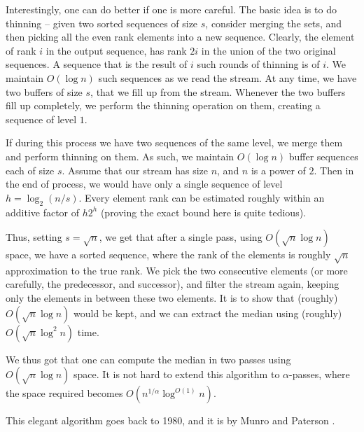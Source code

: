 \begin{remark}
    Interestingly, one can do better if one is more careful. The basic
    idea is to do thinning -- given two sorted sequences of size $s$,
    consider merging the sets, and then picking all the even rank
    elements into a new sequence. Clearly, the element of rank $i$ in
    the output sequence, has rank $2i$ in the union of the two
    original sequences. A sequence that is the result of $i$ such
    rounds of thinning is of  $i$. We maintain
    $O( \log n)$ such sequences as we read the stream. At any time, we
    have two buffers of size $s$, that we fill up from the
    stream. Whenever the two buffers fill up completely, we perform
    the thinning operation on them, creating a sequence of level $1$.

    If during this process we have two sequences of the same level, we
    merge them and perform thinning on them. As such, we maintain
    $O( \log n)$ buffer sequences each of size $s$. Assume that our
    stream has size $n$, and $n$ is a power of $2$. Then in the end of
    process, we would have only a single sequence of level
    $h = \log_2(n/s)$. Every element rank can be estimated roughly within
    an additive factor of $h2^h$ (proving the exact bound here is quite
    tedious).

    Thus, setting $s=\sqrt{n}$, we get that after a single pass, using
    $O( \sqrt{n} \log n)$ space, we have a sorted sequence, where the
    rank of the elements is roughly $\sqrt{n}$ approximation to the true
    rank. We pick the two consecutive elements (or more carefully, the
    predecessor, and successor), and filter the stream again, keeping
    only the elements in between these two elements. It is to show that
    (roughly) $O( \sqrt{n} \log n)$ would be kept, and we can extract the
    median using (roughly) $O( \sqrt{n} \log^2 n)$ time.

    We thus got that one can compute the median in two passes using
    $O(\sqrt{n} \log n)$ space. It is not hard to extend this
    algorithm to $\alpha$-passes, where the space required becomes
    $O(n^{1/\alpha} \log^{O(1)} n)$.

    This elegant algorithm goes back to 1980, and it is by Munro and
    Paterson \cite{mp-ssls-80}.
\end{remark}



